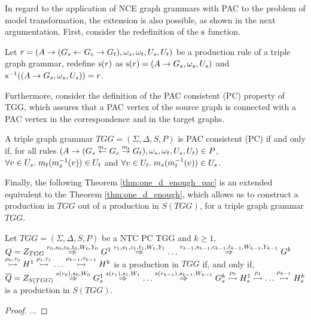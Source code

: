 \documentclass[]{report}
\begin{document}

In regard to the application of NCE graph grammars with PAC to the problem of model transformation, the extension is also possible, as shown in the next argumentation. First, consider the redefinition of the $\source$ function.

\begin{definition}
	\label{def:sourcepac}
	Let $r = (A \pro (G_s \ms{} G_c \mt{} G_t), \omega_s, \omega_t, U_s, U_t)$ be a production rule of a triple graph grammar, redefine $\source(r)$ as $\source(r) = (A \pro G_s,\omega_s,U_s)$ and $\source^{-1}((A \pro G_s,\omega_s,U_s)) = r$.
\end{definition}

Furthermore, consider the definition of the PAC consistent (PC) property of TGG, which assures that a PAC vertex of the source graph is connected with a PAC vertex in the correspondence and in the target graphs.

\begin{definition}
	A triple graph grammar $TGG = (\Sigma, \Delta, S, P)$ is PAC consistent (PC) if and only if, for all rules $(A \pro (G_s \ms{m_s} G_c \mt{m_t} G_t), \omega_s, \omega_t, U_s, U_t) \in P$, $\forall v \in U_s \. m_t(m_s^{-1}(v)) \in U_t$ and $\forall v \in U_t \. m_s(m_t^{-1}(v)) \in U_s$.
\end{definition}

Finally, the following Theorem \ref{thm:one_d_enough_pac} is an extended equivalent to the Theorem \ref{thm:one_d_enough}, which allows us to construct a production in $TGG$ out of a production in $S(TGG)$, for a triple graph grammar $TGG$.

\begin{theorem}
	\label{thm:one_d_enough_pac}
	Let $TGG = (\Sigma, \Delta, S, P)$ be a NTC PC TGG and $k \ge 1$, \\
	$Q = \startTG{TGG} \tderivpac{r_0}{s_0,c_0,t_0}{W_0,Y_0}{} G^1 \tderivpac{r_1}{s_1,c_1,t_1}{W_1,Y_1}{} \dots \tderivpac{r_{k-1}}{s_{k-1},c_{k-1},t_{k-1}}{W_{k-1},Y_{k-1}}{} G^k$\\
	$ \tresolv{\rho_0,\tau_0} H^1 \tresolv{\rho_1,\tau_1} \dots \tresolv{\rho_{k-1},\tau_{k-1}} H^k$ is a production in $TGG$ if, and only if, $\overline{Q} = \startG{S(TGG)} \derivpac{s(r_0)}{s_0}{W_0}{} G^1_s \derivpac{s(r_1)}{s_1}{W_1}{} \dots \derivpac{s(r_{k-1})}{s_{k-1}}{W_{k-1}}{} G^k_s \tresolv{\rho_0} H_s^1 \tresolv{\rho_1} \dots \tresolv{\rho_{k-1}} H_s^k$ is a production in $S(TGG)$.
\end{theorem}
\begin{proof}
	...
\end{proof}
\end{document}
